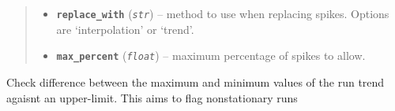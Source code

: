 \documentclass[a4paper,10pt,oneside]{sphinxmanual}
\begin{document}
\begin{fulllineitems}
\begin{quote}
\begin{description}
\begin{itemize}
\item {} 
\textbf{\texttt{replace\_with}} (\emph{\texttt{str}}) -- method to use when replacing spikes. Options are `interpolation' or `trend'.

\item {} 
\textbf{\texttt{max\_percent}} (\emph{\texttt{float}}) -- maximum percentage of spikes to allow.

\end{itemize}

\end{description}\end{quote}

\end{fulllineitems}


\begin{fulllineitems}
\label{pymicra:pymicra.tests.check_stationarity}
Check difference between the maximum and minimum values of the run trend agaisnt an upper-limit.
This aims to flag nonstationary runs

\end{fulllineitems}

\end{document}
